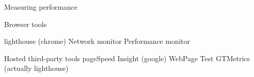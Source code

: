 Measuring performance 

Browser tools 

  lighthouse (chrome)
  Network monitor 
  Performance monitor 

Hosted third-party tools
  pageSpeed Insight (google)
  WebPage Test 
  GTMetrics (actually lighthouse)

